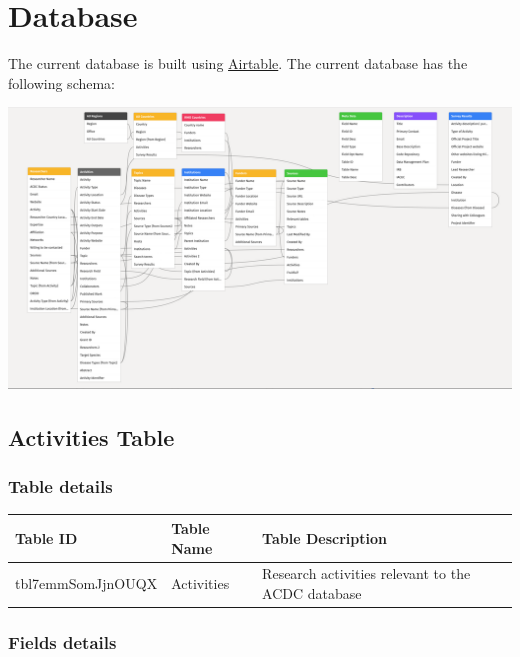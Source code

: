 \documentclass[
]{book}
\begin{document}
\hypertarget{database}{%
\chapter{Database}\label{database}}

The current database is built using \href{https://airtable.com}{Airtable}. The current database has the following schema:

\includegraphics{images/database_schema.png}

\hypertarget{activities-table}{%
\section{Activities Table}\label{activities-table}}

\hypertarget{table-details}{%
\subsection{Table details}\label{table-details}}

\begin{table}
\centering
\begin{tabular}{l|l|l}
\hline
\textbf{Table ID} & \textbf{Table Name} & \textbf{Table Description}\\
\hline
tbl7emmSomJjnOUQX & Activities & Research activities relevant to the ACDC database\\
\hline
\end{tabular}
\end{table}

\hypertarget{fields-details}{%
\subsection{Fields details}\label{fields-details}}
\end{document}
